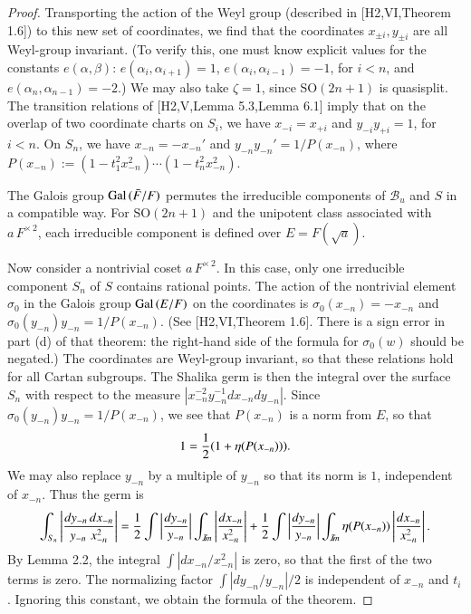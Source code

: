 \documentclass{amsart}
\newcommand\Gal{\hbox{Gal\,}}
\newcommand\Imm{{\mathcal I\hskip-.2em m}}
\newcommand\bF{{\bar F}}
\begin{document}
\begin{proof}
Transporting the action of the Weyl group (described in
[H2,VI,Theorem 1.6]) to this new set of coordinates, 
we find that the coordinates $x_{\pm i}, y_{\pm i}$ are all
Weyl-group invariant.  (To verify this, one must know explicit
values for the constants $e(\alpha,\beta)$:
$e(\alpha_i,\alpha_{i+1}) = 1$, $e(\alpha_{i},\alpha_{i-1})=
-1$, for $i<n$,  and $e(\alpha_n,\alpha_{n-1}) = -2$.)
We may also take $\zeta=1$, since $\text{SO}(2n+1)$ is quasisplit.
The transition relations of
[H2,V,Lemma 5.3,Lemma 6.1] imply that on the overlap of
two coordinate charts on $S_i$, we have
$x_{-i} = x_{+i}$ and $y_{-i} y_{+i}=1$, for $i<n$.
On $S_n$, we have $x_{-n} = -x_{-n}'$ and $y_{-n} y_{-n}' = 1/P(x_{-n})$,
where $P(x_{-n}):= (1-t_1^2 x_{-n}^2)\cdots (1-t_n^2 x_{-n}^2)$.

The
Galois group $\Gal(\bF/F)$ permutes the irreducible
components of ${\mathcal B}_u$ and $S$ in a compatible way.  For
$\text{SO}(2n+1)$ and the unipotent class associated with $a\,F^{\times\,2}$,
each irreducible component is defined over $E=F(\sqrt{a})$.  

Now consider a nontrivial coset $a\,F^{\times\,2}$.
In this case,
only one
irreducible component $S_n$ of $S$ contains rational points.
The action of the nontrivial element $\sigma_0$ in
the Galois group $\Gal(E/F)$ on the coordinates
is $\sigma_0(x_{-n}) = -x_{-n}$ and 
$\sigma_0(y_{-n}) y_{-n} = 1/P(x_{-n})$. 
(See [H2,VI,Theorem 1.6].
There is a sign error in part (d) of that theorem:
the right-hand side of the formula for $\sigma_0(w)$
should be negated.)
The coordinates are Weyl-group invariant, so that these
relations hold for all Cartan subgroups.
The Shalika germ is then the integral over the surface $S_n$
with respect to the measure $|x_{-n}^{-2} y_{-n}^{-1} dx_{-n} dy_{-n}|$.
Since $\sigma_0(y_{-n}) y_{-n} = 1/P(x_{-n})$, we see that $P(x_{-n})$
is a norm from $E$, so that
$$1 = {1\over 2} (1 + \eta(P(x_{-n}))).$$
We may also replace $y_{-n}$ by a multiple of $y_{-n}$ so that
its norm is $1$, independent of $x_{-n}$.
Thus the germ is
$$\int_{S_n} \left| {dy_{-n}\, dx_{-n}\over y_{-n}\,\, x_{-n}^2}\right|
= {1\over 2} \int\left | {dy_{-n}\over y_{-n}}\right|
 \int_{\Imm}\left | dx_{-n}\over x_{-n}^2 \right| +
 {1\over 2} \int\left | {dy_{-n}\over y_{-n}}\right|
 \int_\Imm \eta(P(x_{-n}))\left | dx_{-n}\over x_{-n}^2 \right|.$$
By Lemma 2.2, the integral $\int |dx_{-n}/x_{-n}^2|$ is zero,
so that the first of the two terms is zero.  The normalizing
factor $\int |dy_{-n}/y_{-n}|/2$ is independent
of $x_{-n}$ and $t_i$.  Ignoring this constant,
we obtain the formula of the theorem.


\end{proof}
\end{document}
